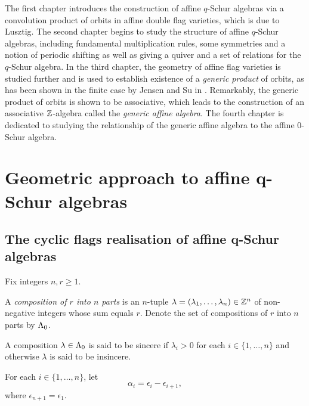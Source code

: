 \documentclass[a4paper, 11pt]{report}
\begin{document}
The first chapter introduces the construction of affine $q$-Schur algebras via a convolution product of orbits in affine double flag varieties, which is due to Lusztig. The second chapter begins to study the structure of affine $q$-Schur algebras, including fundamental multiplication rules, some symmetries and a notion of periodic shifting as well as giving a quiver and a set of relations for the $q$-Schur algebra. In the third chapter, the geometry of affine flag varieties is studied further and is used to establish existence of a \emph{generic product} of orbits, as has been shown in the finite case by Jensen and Su in \cite{su12}. Remarkably, the generic product of orbits is shown to be associative, which leads to the construction of an associative $\mathbb{Z}$-algebra called the \emph{generic affine algebra}. The fourth chapter is dedicated to studying the relationship of the generic affine algebra to the affine $0$-Schur algebra.




\chapter{Geometric approach to affine q-Schur algebras}


\section{The cyclic flags realisation of affine q-Schur algebras}

Fix integers $n,r\geq 1$.

\begin{definition}\label{def:compositions}
A \emph{composition of $r$ into $n$ parts} is an $n$-tuple $\lambda=(\lambda_1,\ldots,\lambda_n)\in\mathbb{Z}^n$ of non-negative integers whose sum equals $r$. Denote the set of compositions of $r$ into $n$ parts by $\Lambda_0{}$.
\end{definition}

A composition $\lambda\in\Lambda_0{}$ is said to be sincere if $\lambda_i>0$ for each $i\in\{1,\ldots,n\}$ and otherwise $\lambda$ is said to be insincere.

For each $i\in\{1,\ldots,n\}$, let
\begin{equation*}
\alpha_i = \epsilon_i - \epsilon_{i+1},
\end{equation*}
where $\epsilon_{n+1}=\epsilon_1$.
\end{document}
